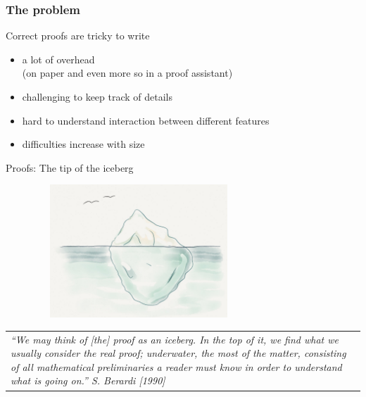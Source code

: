 \documentclass{beamer}
\begin{document}
\begin{frame}
  \frametitle{The problem}
  \vspace{-3cm}
Correct proofs are tricky to write 
\begin{itemize}
\item a lot of overhead \\(on paper and even more so in a proof assistant)
\item challenging to keep track of details
\item hard to understand interaction between different features
\item difficulties increase with size 
\end{itemize}

\end{frame}

\begin{frame}{Proofs: The tip of the iceberg}

 \begin{center}     
 \includegraphics[width=10cm,height=5cm,clip=true]{pics/eisberg.jpg}
 \end{center}

 \begin{small}
   \begin{tabular}{p{11cm}}
 {\textit{
 ``We may think of [the] proof as an iceberg. In the top of it, we find what we
 usually consider the real proof; underwater, the most  of the matter, consisting
 of all mathematical preliminaries a reader must know in order to understand what
 is going on.'' \hfill S. Berardi [1990]
 }    }
   \end{tabular}

 \end{small}


\end{frame}
\end{document}
